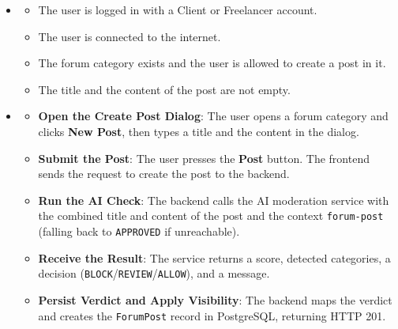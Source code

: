 
\begin{itemize}[leftmargin=1.6em,topsep=4pt,itemsep=3pt,parsep=0pt,label=$\bullet$]
    \item {}
        \begin{itemize}[leftmargin=2.2em,topsep=2pt,itemsep=3pt,parsep=0pt,label=$\circ$]
            \item The user is logged in with a Client or Freelancer account.
            \item The user is connected to the internet.
            \item The forum category exists and the user is allowed to create a post in it.
            \item The title and the content of the post are not empty.
        \end{itemize}
    \item {}
        \begin{itemize}[leftmargin=2.2em,topsep=2pt,itemsep=3pt,parsep=0pt,label=$\circ$]
            \item \textbf{Open the Create Post Dialog}: The user opens a forum category and clicks \textbf{New Post}, then types a title and the content in the dialog.
            \item \textbf{Submit the Post}: The user presses the \textbf{Post} button. The frontend sends the request to create the post to the backend.
            \item \textbf{Run the AI Check}: The backend calls the AI moderation service with the combined title and content of the post and the context \texttt{forum-post} (falling back to \texttt{APPROVED} if unreachable).
            \item \textbf{Receive the Result}: The service returns a score, detected categories, a decision (\texttt{BLOCK}/\texttt{REVIEW}/\texttt{ALLOW}), and a message.
            \item \textbf{Persist Verdict and Apply Visibility}: The backend maps the verdict and creates the \texttt{ForumPost} record in PostgreSQL, returning HTTP 201.
                \begin{itemize}[leftmargin=2.2em,topsep=2pt,itemsep=3pt,parsep=0pt,label=$\blacksquare$]

\end{itemize}
\end{itemize}
\end{itemize}
